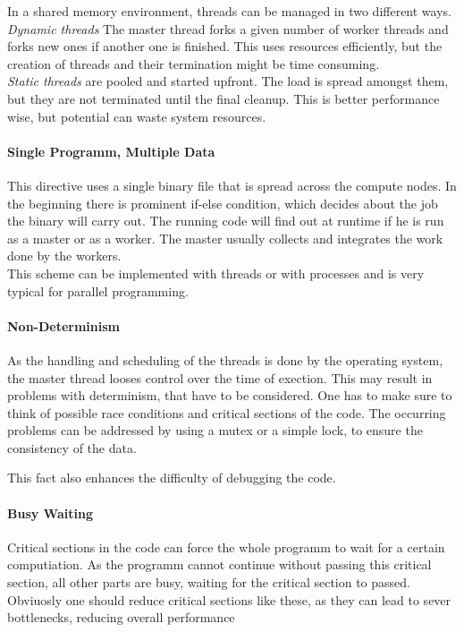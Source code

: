 \documentclass{article}
\begin{document}
	In a shared memory environment,
	threads can be managed in two different ways.
	\textsl{Dynamic threads} The master thread forks a given number of worker threads
	and forks new ones if another one is finished.
	This uses resources efficiently,
	but the creation of threads and their termination might be time consuming.\\
	\textsl{Static threads} are pooled and started upfront.
	The load is spread amongst them,
	but they are not terminated until the final cleanup.
	This is better performance wise,
	but potential can waste system resources.

\paragraph*{Single Programm, Multiple Data} %
\label{par:single_programm_multiple_data}
	This directive uses a single binary file that is spread across the compute nodes.
	In the beginning there is prominent if-else condition,
	which decides about the job the binary will carry out.
	The running code will find out at runtime if he is run as a master
	or as a worker.
	The master usually collects and integrates the work done by the workers.\\
	This scheme can be implemented with threads or with processes
	and is very typical for parallel programming.

\paragraph*{Non-Determinism} %
\label{par:non_determinism}
	As the handling and scheduling of the threads is done by the operating system,
	the master thread looses control over the time of exection.
	This may result in problems with determinism,
	that have to be considered.
	One has to make sure to think of possible race conditions
	and critical sections of the code.
	The occurring problems can be addressed by using a mutex or a simple lock,
	to ensure the consistency of the data.

	This fact also enhances the difficulty of debugging the code.

\paragraph*{Busy Waiting} %
\label{par:busy_waiting}
	Critical sections in the code can force the whole programm to wait for a certain computiation.
	As the programm cannot continue without passing this critical section,
	all other parts are busy, waiting for the critical section to passed.
	Obviuosly one should reduce critical sections like these,
	as they can lead to sever bottlenecks,
	reducing overall performance
\end{document}
